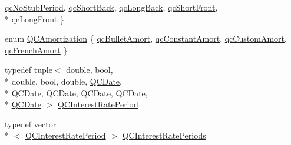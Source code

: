 \begin{DoxyCompactItemize}
\hyperlink{class_q_c_interest_rate_leg_a70e636ef79eb9bc4c6b84ea526e56521a9592d97e5d62002ed8627becb8c57e3c}{qc\+No\+Stub\+Period}, 
\hyperlink{class_q_c_interest_rate_leg_a70e636ef79eb9bc4c6b84ea526e56521a0b8c273f0d11ba32f6e5107f8d8d553f}{qc\+Short\+Back}, 
\hyperlink{class_q_c_interest_rate_leg_a70e636ef79eb9bc4c6b84ea526e56521adc69e9195eb58047e3e88d4df28165fd}{qc\+Long\+Back}, 
\hyperlink{class_q_c_interest_rate_leg_a70e636ef79eb9bc4c6b84ea526e56521a44b8519b515a711742b848de497f8fb7}{qc\+Short\+Front}, 
\\*
\hyperlink{class_q_c_interest_rate_leg_a70e636ef79eb9bc4c6b84ea526e56521a450dca2a6a27aa9cc77d4e9d2db0f65c}{qc\+Long\+Front}
 \}
\item 
enum \hyperlink{class_q_c_interest_rate_leg_a2da089524f9b18ebc2e4dcf23699e597}{Q\+C\+Amortization} \{ \hyperlink{class_q_c_interest_rate_leg_a2da089524f9b18ebc2e4dcf23699e597ae8e154638e8c9a260b16e7320fe9715f}{qc\+Bullet\+Amort}, 
\hyperlink{class_q_c_interest_rate_leg_a2da089524f9b18ebc2e4dcf23699e597ab20a6b7426bc2b27dcf35473069be7cc}{qc\+Constant\+Amort}, 
\hyperlink{class_q_c_interest_rate_leg_a2da089524f9b18ebc2e4dcf23699e597a57b98239a4575db8ca5420b946672a55}{qc\+Custom\+Amort}, 
\hyperlink{class_q_c_interest_rate_leg_a2da089524f9b18ebc2e4dcf23699e597a22ba233a002800b75a4e73b20f0d74b8}{qc\+French\+Amort}
 \}
\item 
typedef tuple$<$ double, bool, \\*
double, bool, double, \hyperlink{class_q_c_date}{Q\+C\+Date}, \\*
\hyperlink{class_q_c_date}{Q\+C\+Date}, \hyperlink{class_q_c_date}{Q\+C\+Date}, \hyperlink{class_q_c_date}{Q\+C\+Date}, \hyperlink{class_q_c_date}{Q\+C\+Date}, \\*
\hyperlink{class_q_c_date}{Q\+C\+Date} $>$ \hyperlink{class_q_c_interest_rate_leg_af680c8ddf16eba5370b8a71c60955f98}{Q\+C\+Interest\+Rate\+Period}
\item 
typedef vector\\*
$<$ \hyperlink{class_q_c_interest_rate_leg_af680c8ddf16eba5370b8a71c60955f98}{Q\+C\+Interest\+Rate\+Period} $>$ \hyperlink{class_q_c_interest_rate_leg_ad04f1da06a7b5d44fea906bd8c62de28}{Q\+C\+Interest\+Rate\+Periods}
\end{DoxyCompactItemize}
